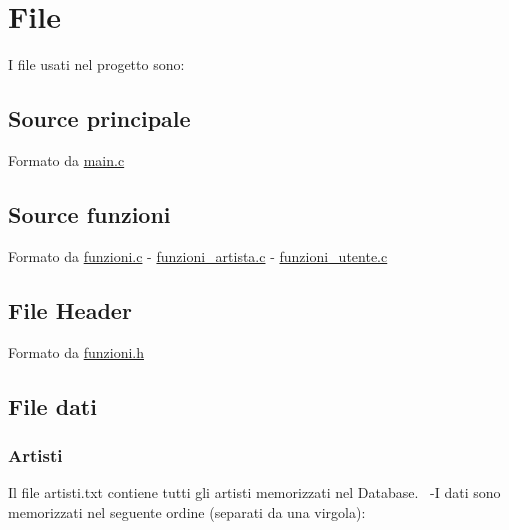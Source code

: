 \hypertarget{index_file_sec}{}\section{File}\label{index_file_sec}
I file usati nel progetto sono\+: \hypertarget{index_file1}{}\subsection{Source principale}\label{index_file1}
Formato da \mbox{\hyperlink{main_8c}{main.\+c}} \hypertarget{index_file2}{}\subsection{Source funzioni}\label{index_file2}
Formato da \mbox{\hyperlink{funzioni_8c}{funzioni.\+c}} -\/ \mbox{\hyperlink{funzioni__artista_8c}{funzioni\+\_\+artista.\+c}} -\/ \mbox{\hyperlink{funzioni__utente_8c}{funzioni\+\_\+utente.\+c}} \hypertarget{index_file3}{}\subsection{File Header}\label{index_file3}
Formato da \mbox{\hyperlink{funzioni_8h}{funzioni.\+h}} \hypertarget{index_file4-5-6}{}\subsection{File dati}\label{index_file4-5-6}
\hypertarget{index_artisti}{}\subsubsection{Artisti}\label{index_artisti}
Il file artisti.\+txt contiene tutti gli artisti memorizzati nel Database.~\newline
 -\/I dati sono memorizzati nel seguente ordine (separati da una virgola)\+:
